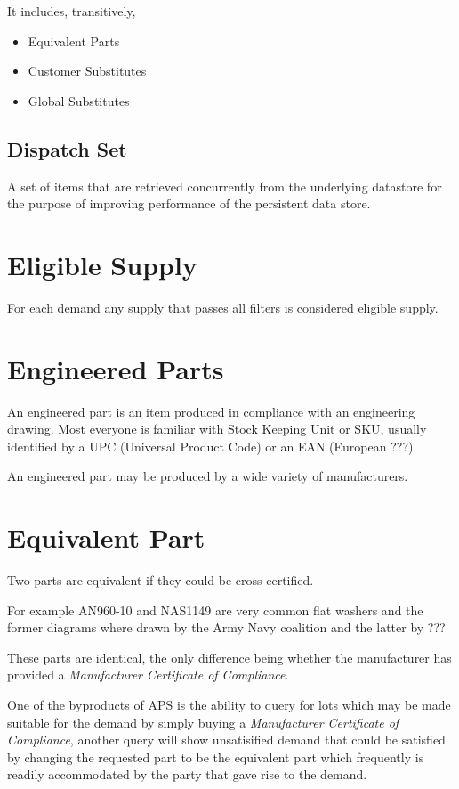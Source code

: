 \documentclass[letterpaper,10pt,english]{sphinxmanual}
\begin{document}
It includes, transitively,
\begin{itemize}
\item {} 
Equivalent Parts

\item {} 
Customer Substitutes

\item {} 
Global Substitutes

\end{itemize}


\subsection{Dispatch Set}
\label{APS/Glossary:dispatch-set}
A set of items that are retrieved concurrently from the underlying
datastore for the purpose of improving performance of the persistent
data store.


\section{Eligible Supply}
\label{APS/Glossary:eligible-supply}
For each demand any supply that passes all filters is considered
eligible supply.


\section{Engineered Parts}
\label{APS/Glossary:engineered-parts}
An engineered part is an item produced in compliance with an engineering
drawing. Most everyone is familiar with Stock Keeping Unit or SKU,
usually identified by a UPC (Universal Product Code) or an EAN (European
???).

An engineered part may be produced by a wide variety of manufacturers.


\section{Equivalent Part}
\label{APS/Glossary:equivalent-part}
Two parts are equivalent if they could be cross certified.

For example AN960-10 and NAS1149 are very common flat washers and the
former diagrams where drawn by the Army Navy coalition and the latter by
???

These parts are identical, the only difference being whether the
manufacturer has provided a \emph{Manufacturer Certificate of Compliance}.

One of the byproducts of APS is the ability to query for lots which may
be made suitable for the demand by simply buying a \emph{Manufacturer
Certificate of Compliance}, another query will show unsatisified demand
that could be satisfied by changing the requested part to be the
equivalent part which frequently is readily accommodated by the party
that gave rise to the demand.
\end{document}
